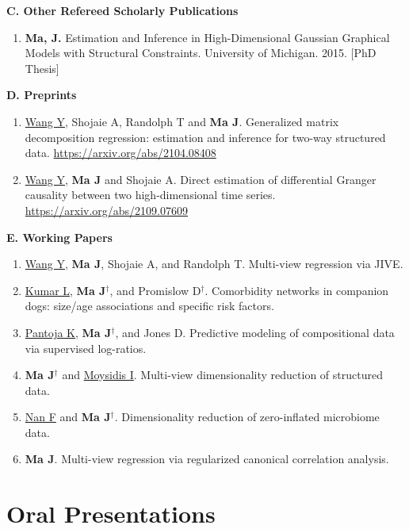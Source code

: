 \documentclass[10pt]{article}
\begin{document}
\textbf{C. Other Refereed Scholarly Publications}
\begin{enumerate}
\item \textbf{Ma, J.} Estimation and Inference in High-Dimensional Gaussian Graphical Models  with Structural Constraints. University of Michigan. 2015. [PhD Thesis]
\end{enumerate}

\textbf{D.  Preprints}
\begin{enumerate}
\item \underline{Wang Y}, Shojaie A, Randolph T and \textbf{Ma J}. Generalized matrix decomposition regression: estimation and inference for two-way structured data. \url{https://arxiv.org/abs/2104.08408}
\item \underline{Wang Y}, \textbf{Ma J} and Shojaie A. Direct estimation of differential Granger causality between two high-dimensional time series.  \url{https://arxiv.org/abs/2109.07609}
\end{enumerate}

\textbf{E. Working Papers}
\begin{enumerate}\setcounter{enumi}{0}
\item \underline{Wang Y}, \textbf{Ma J}, Shojaie A, and Randolph T. Multi-view regression via JIVE. 
\item \underline{Kumar L}, \textbf{Ma J}$^{\dagger}$, and Promislow D$^{\dagger}$. Comorbidity networks in companion dogs: size/age associations and specific risk factors. 
\item \underline{Pantoja K}, \textbf{Ma J}$^{\dagger}$, and Jones D. Predictive modeling of compositional data via supervised log-ratios.
\item \textbf{Ma J}$^{\dagger}$ and \underline{Moysidis I}. Multi-view dimensionality reduction of structured data. 
\item \underline{Nan F} and \textbf{Ma J}$^{\dagger}$. Dimensionality reduction of zero-inflated microbiome data. 
\item \textbf{Ma J}. Multi-view regression via regularized canonical correlation analysis. 
\end{enumerate}


\section*{Oral Presentations}
\end{document}
